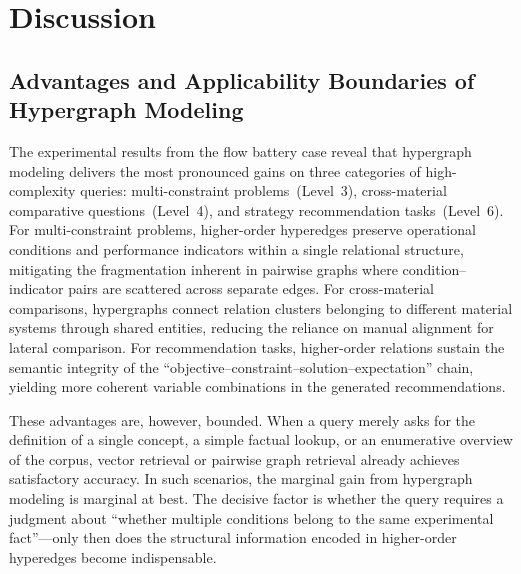 \section{Discussion}
\label{sec:discussion}

\subsection{Advantages and Applicability Boundaries of Hypergraph Modeling}

The experimental results from the flow battery case reveal that hypergraph modeling delivers the most pronounced gains on three categories of high-complexity queries: multi-constraint problems~(Level~3), cross-material comparative questions~(Level~4), and strategy recommendation tasks~(Level~6). For multi-constraint problems, higher-order hyperedges preserve operational conditions and performance indicators within a single relational structure, mitigating the fragmentation inherent in pairwise graphs where condition--indicator pairs are scattered across separate edges. For cross-material comparisons, hypergraphs connect relation clusters belonging to different material systems through shared entities, reducing the reliance on manual alignment for lateral comparison. For recommendation tasks, higher-order relations sustain the semantic integrity of the ``objective--constraint--solution--expectation'' chain, yielding more coherent variable combinations in the generated recommendations.

These advantages are, however, bounded. When a query merely asks for the definition of a single concept, a simple factual lookup, or an enumerative overview of the corpus, vector retrieval or pairwise graph retrieval already achieves satisfactory accuracy. In such scenarios, the marginal gain from hypergraph modeling is marginal at best. The decisive factor is whether the query requires a judgment about ``whether multiple conditions belong to the same experimental fact''---only then does the structural information encoded in higher-order hyperedges become indispensable.

